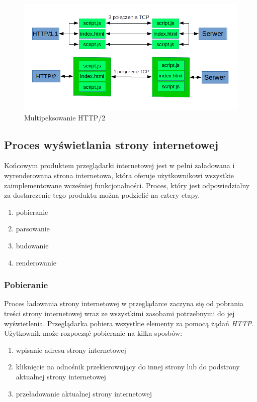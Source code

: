 \documentclass[polish, twoside, 12pt]{mwart}
\begin{document}
\begin{figure}[ht]
  \includegraphics[width=\textwidth]{http2-mux.png}
	\caption{Multipeksowanie HTTP/2}
\end{figure}

\subsection{Proces wyświetlania strony internetowej}

Końcowym produktem przeglądarki internetowej jest w pełni załadowana i wyrenderowana strona internetowa, która oferuje użytkownikowi wszystkie zaimplementowane wcześniej funkcjonalności. Proces, który jest odpowiedzialny za dostarczenie tego produktu można podzielić na cztery etapy.

\begin{enumerate}
  \item pobieranie
  \item parsowanie
  \item budowanie
  \item renderowanie
\end{enumerate}

\subsubsection{Pobieranie}

Proces ładowania strony internetowej w przeglądarce zaczyna się od pobrania treści strony internetowej wraz ze wszystkimi zasobami potrzebnymi do jej wyświetlenia.
Przeglądarka pobiera wszystkie elementy za pomocą żądań \emph{HTTP}. Użytkownik może rozpocząć pobieranie na kilka sposbów:

\begin{enumerate}
  \item wpisanie adresu strony internetowej
  \item kliknięcie na odnośnik przekierowujący do innej strony lub do podstrony aktualnej strony internetowej
  \item przeładowanie aktualnej strony internetowej
\end{enumerate}
\end{document}
